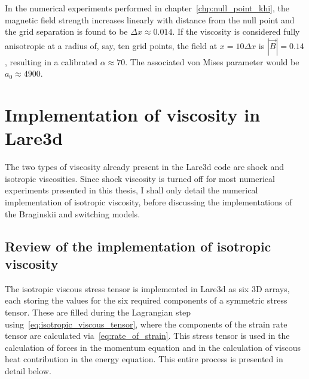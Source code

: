 In the numerical experiments performed in chapter~\ref{chp:null_point_khi}, the magnetic field strength increases linearly with distance from the null point and the grid separation is found to be $\Delta x \approx 0.014$. If the viscosity is considered fully anisotropic at a radius of, say, ten grid points, the field at $x = 10 \Delta x$ is $|\vec{B}| = 0.14$, resulting in a calibrated $\alpha \approx 70$. The associated von Mises parameter would be $a_0 \approx 4900$. 

\section{Implementation of viscosity in Lare3d}

The two types of viscosity already present in the Lare3d code are shock and isotropic viscosities. Since shock viscosity is turned off for most numerical experiments presented in this thesis, I shall only detail the numerical implementation of isotropic viscosity, before discussing the implementations of the Braginskii and switching models.

\subsection{Review of the implementation of isotropic viscosity}

The isotropic viscous stress tensor is implemented in Lare3d as six 3D arrays, each storing the values for the six required components of a symmetric stress tensor. These are filled during the Lagrangian step using~\eqref{eq:isotropic_viscous_tensor}, where the components of the strain rate tensor are calculated via~\eqref{eq:rate_of_strain}. This stress tensor is used in the calculation of forces in the momentum equation and in the calculation of viscous heat contribution in the energy equation. This entire process is presented in detail below.

